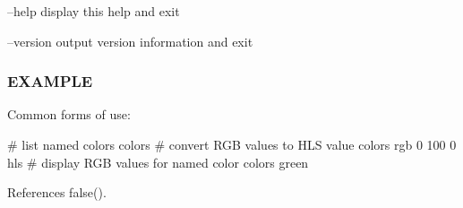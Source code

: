 --help display this help and exit

--version output version information and exit

\subsubsection*{E\+X\+A\+M\+P\+LE}

\begin{DoxyVerb} Common forms of use:

  # list named colors
  colors
  # convert RGB values to HLS value
  colors rgb 0 100 0 hls
  # display RGB values for named color
  colors green \end{DoxyVerb}
 

References false().

